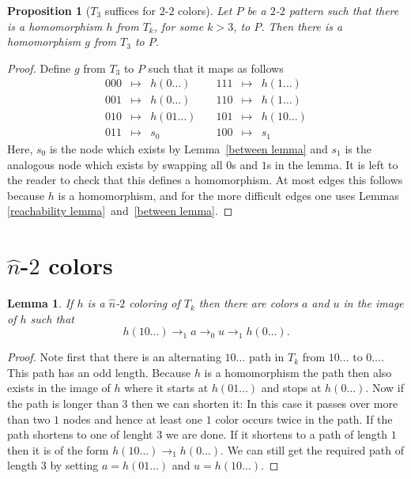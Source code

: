\documentclass[a4paper]{article}
\newtheorem{lemma}[theorem]{Lemma}
\newtheorem{proposition}[theorem]{Proposition}
\begin{document}
\begin{proposition}[$T_3$ suffices for $2$-$2$ colors]
 Let $P$ be a $2$-$2$ pattern such that there is a homomorphism $h$ from
$T_k$, for some $k > 3$, to $P$. Then there is a homomorphism $g$ from
$T_3$ to $P$.
\end{proposition}
\begin{proof}
Define $g$ from $T_3$ to $P$ such that it maps as follows
\[
 \begin{array}{rcl}
 000 & \mapsto & h(0\dots) \\
 001 & \mapsto & h(0\dots) \\
 010 & \mapsto & h(01\dots) \\
 011 & \mapsto & s_0
 \end{array} \quad
 \begin{array}{rcl}
 111 & \mapsto & h(1\dots) \\
 110 & \mapsto & h(1\dots) \\
 101 & \mapsto & h(10\dots) \\
 100 & \mapsto & s_1
 \end{array}
\]
Here, $s_0$ is the node which exists by Lemma~\ref{between lemma} and
$s_1$ is the analogous node which exists by swapping all $0$s and $1$s
in the lemma. It is left to the reader to check that this defines a
homomorphism. At most edges this follows because $h$ is a homomorphism,
and for the more difficult edges one uses Lemmas \ref{reachability
lemma}~and~\ref{between lemma}.
\end{proof}

\section*{$\hat{n}$-$2$ colors}

\begin{lemma} \label{hat one}
 If $h$ is a $\hat{n}$-$2$ coloring of $T_k$ then there are colors $a$
and $u$ in the image of $h$ such that
\[
 h(10\dots) \rightarrow_1 a \rightarrow_0 u \rightarrow_1 h(0\dots).
\]
\end{lemma}
\begin{proof}
 Note first that there is an alternating $10 \dots$ path in $T_k$ from
$10\dots$ to $0 \dots$. This path has an odd length. Because $h$ is a
homomorphism the path then also exists in the image of $h$ where it
starts at $h(01\dots)$ and stops at $h(0\dots)$. Now if the path is
longer than $3$ then we can shorten it: In this case it passes over more
than two $1$ nodes and hence at least one $1$ color occurs twice in the
path. If the path shortens to one of lenght $3$ we are done. If it
shortens to a path of length $1$ then it is of the form $h(10\dots)
\rightarrow_1 h(0\dots)$. We can still get the required path of length
$3$ by setting $a = h(01\dots)$ and $u = h(10\dots)$.
\end{proof}
\end{document}
